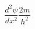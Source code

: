 \documentclass[ ]{article}
\begin{document}
	$$\frac{d^2\psi}{dx^2} \frac{2m}{h^2}$$
\end{document}
